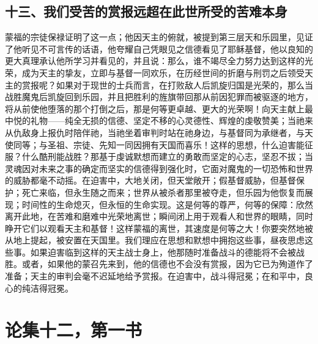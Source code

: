 \subsection{十三、我们受苦的赏报远超在此世所受的苦难本身}

蒙福的宗徒保禄证明了这一点；他因天主的俯就，被提到第三层天和乐园里，见证了他听见不可言传的话语，他夸耀自己凭眼见之信德看见了耶稣基督，他以良知的更大真理承认他所学习并看见的，并且说：那么，谁不竭尽全力努力达到这样的光荣，成为天主的挚友，立即与基督一同欢乐，在历经世间的折磨与刑罚之后领受天主的赏报呢？如果对于现世的士兵而言，在打败敌人后凯旋归国是光荣的，那么当战胜魔鬼后凯旋回到乐园，并且把胜利的旌旗带回那从前因犯罪而被驱逐的地方，将从前使他堕落的那个打倒之后，那是何等更卓越、更大的光荣啊！向天主献上最中悦的礼物——纯全无损的信德、坚定不移的心灵德性、辉煌的虔敬赞美；当祂来从仇敌身上报仇时陪伴祂，当祂坐着审判时站在祂身边，与基督同为承继者，与天使同等；与圣祖、宗徒、先知一同因拥有天国而喜乐！这样的思想，什么迫害能征服？什么酷刑能战胜？那基于虔诚默想而建立的勇敢而坚定的心志，坚忍不拔；当灵魂因对未来之事的确定而坚实的信德得到强化时，它面对魔鬼的一切恐怖和世界的威胁都毫不动摇。在迫害中，大地关闭，但天堂敞开；假基督威胁，但基督保护；死亡来临，但永生随之而来；世界从被杀者那里被夺走，但乐园为他恢复而展现；时间性的生命熄灭，但永恒的生命实现。这是何等的尊严，何等的保障：欣然离开此地，在苦难和磨难中光荣地离世；瞬间闭上用于观看人和世界的眼睛，同时睁开它们以观看天主和基督！这样蒙福的离世，其速度是何等之大！你要突然地被从地上提起，被安置在天国里。我们理应在思想和默想中拥抱这些事，昼夜思虑这些事。如果迫害临到这样的天主战士身上，他那随时准备战斗的德能将不会被战胜。或者，如果他的蒙召先来到，他的信德也不会没有赏报，因为它已为殉道作了准备；天主的审判会毫不迟延地给予赏报。在迫害中，战斗得冠冕；在和平中，良心的纯洁得冠冕。\par



\section{论集十二，第一书}

\par

